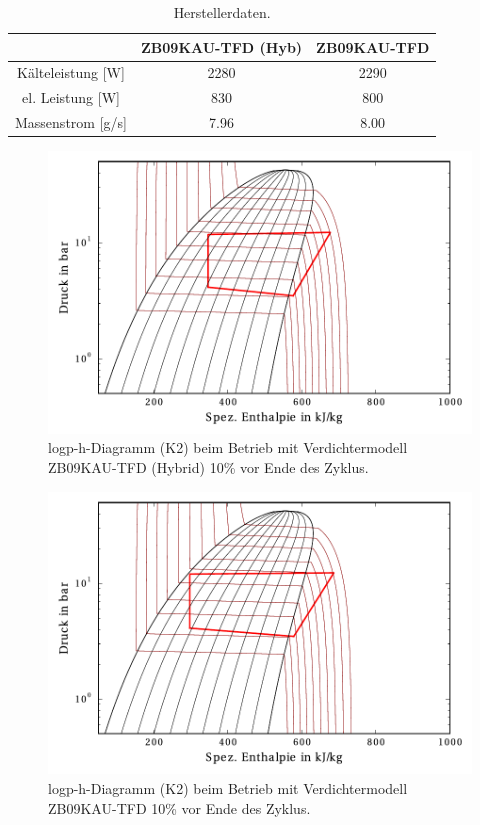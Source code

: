 \begin{table}[h!]
\centering
\caption{Herstellerdaten.}
\label{tab:Verdichterdatenblatt}
\begin{tabular}{|ccc|}
\hline
                                            & ZB09KAU-TFD (Hyb)         & ZB09KAU-TFD \\ \hline
\multicolumn{1}{|c|}{Kälteleistung {[}W{]}} & \multicolumn{1}{c|}{2280} & 2290        \\
\multicolumn{1}{|c|}{el. Leistung {[}W{]}}  & \multicolumn{1}{c|}{830}  & 800         \\
\multicolumn{1}{|c|}{Massenstrom {[}g/s{]}} & \multicolumn{1}{c|}{7.96} & 8.00        \\ \hline
\end{tabular}
\end{table}


\begin{figure}[h!]
\centering
\includegraphics[scale=0.8]{Pictures/51/log_ph_lastCycle10perc_C21.pdf}
\caption{logp-h-Diagramm (K2) beim Betrieb mit Verdichtermodell ZB09KAU-TFD (Hybrid) \unit{10}{\%} vor Ende des Zyklus.}
\label{fig:logph51}
\end{figure}

\begin{figure}[h!]
\centering
\includegraphics[scale=0.8]{Pictures/54/log_ph_lastCycle10perc_C21.pdf}
\caption{logp-h-Diagramm (K2) beim Betrieb mit Verdichtermodell ZB09KAU-TFD \unit{10}{\%} vor Ende des Zyklus.}
\label{fig:logph54}
\end{figure}






